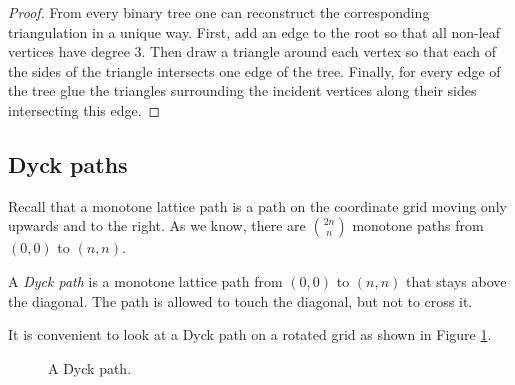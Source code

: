 \begin{page}
\begin{proof}
From every binary tree one can reconstruct the corresponding triangulation in a unique way.
First, add an edge to the root so that all non-leaf vertices have degree $3$.
Then draw a triangle around each vertex so that each of the sides of the triangle intersects one edge of the tree.
Finally, for every edge of the tree glue the triangles surrounding the incident vertices along their sides intersecting this edge.
\end{proof}




\end{page}

\begin{page}
\setcounter{section}{4}
\setcounter{subsection}{5}
\setcounter{dfn}{6}
\label{portion:991}

\subsection{Dyck paths}
Recall that a monotone lattice path is a path on the coordinate grid moving only upwards and to the right.
As we know, there are $\binom{2n}{n}$ monotone paths from $(0,0)$ to $(n,n)$.


\end{page}

\begin{page}
\setcounter{section}{4}
\setcounter{subsection}{5}
\setcounter{dfn}{7}
\label{portion:993}

\begin{dfn}
A \emph{Dyck path} is a monotone lattice path from $(0,0)$ to $(n,n)$ that stays above the diagonal.
The path is allowed to touch the diagonal, but not to cross it.
\end{dfn}

\end{page}

\begin{page}
\setcounter{section}{4}
\setcounter{subsection}{5}
\setcounter{dfn}{7}
\label{portion:994}


It is convenient to look at a Dyck path on a rotated grid as shown in Figure \ref{fig:DyckPath}.

\begin{figure}[ht]
\begin{center}

\end{center}
\caption{A Dyck path.}
\label{fig:DyckPath}
\end{figure}



\end{page}

